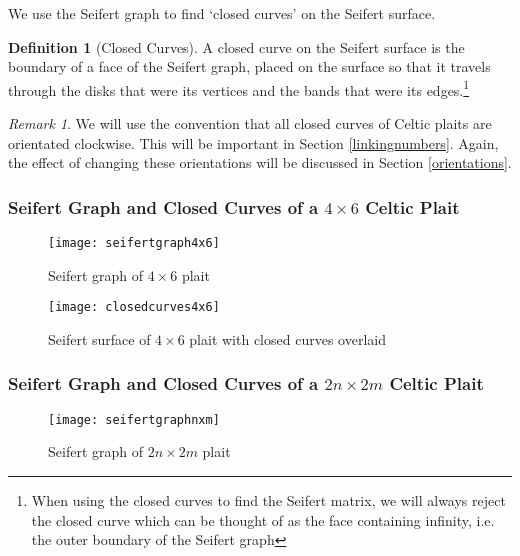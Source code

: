 \documentclass[10pt,a4paper]{report}
\theoremstyle{definition}
\newtheorem{definition}{Definition}[section]
\theoremstyle{remark}
\newtheorem*{remark}{Remark}
\theoremstyle{example}
\begin{document}
 We use the Seifert graph to find `closed curves' on the Seifert surface.
 
 \begin{definition}[Closed Curves]
 
A closed curve on the Seifert surface is the boundary of a face of the Seifert graph, placed on the surface so that it travels through the disks that were its vertices and the bands that were its edges.\footnote{When using the closed curves to find the Seifert matrix, we will always reject the closed curve which can be thought of as the face containing infinity, i.e. the outer boundary of the Seifert graph}
\end{definition}

\begin{remark}
We will use the convention that all closed curves of Celtic plaits are orientated clockwise. This will be important in Section \ref{linkingnumbers}. Again, the effect of changing these orientations will be discussed in Section \ref{orientations}.
\end{remark}

\subsubsection{Seifert Graph and Closed Curves of a $4\times 6$ Celtic Plait}

\begin{figure}[H]
\centering
\graphicspath{{/Users/Imogen/Desktop/seifertimages/lapath/}}
\texttt{[image: seifertgraph4x6]}
\caption{Seifert graph of $4\times6$ plait}
\label{seifertgraph4x6}
\end{figure}

\begin{figure}[H]
\centering
\graphicspath{{/Users/Imogen/Desktop/seifertimages/lapath/}}
\texttt{[image: closedcurves4x6]}
\caption{Seifert surface of $4\times6$ plait with closed curves overlaid}
\label{closedcurves4x6}
\end{figure}

\subsubsection{Seifert Graph and Closed Curves of a $2n\times 2m$ Celtic Plait}

 \begin{figure}[H]
\centering
\graphicspath{{/Users/Imogen/Desktop/seifertimages/lapath/}}
\texttt{[image: seifertgraphnxm]}
\caption{Seifert graph of $2n\times2m$ plait}
\label{seifertgraphnxm}
\end{figure}
  
\end{document}

